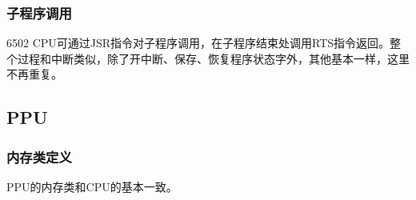 \documentclass[a4paper]{ltxdoc}
\begin{document}
{\subsubsection{子程序调用}
6502 CPU可通过JSR指令对子程序调用，在子程序结束处调用RTS指令返回。整个过程和中断类似，除了开中断、保存、恢复程序状态字外，其他基本一样，这里不再重复。

\subsection{PPU}
\subsubsection{内存类定义}
PPU的内存类和CPU的基本一致。

}
\end{document}
